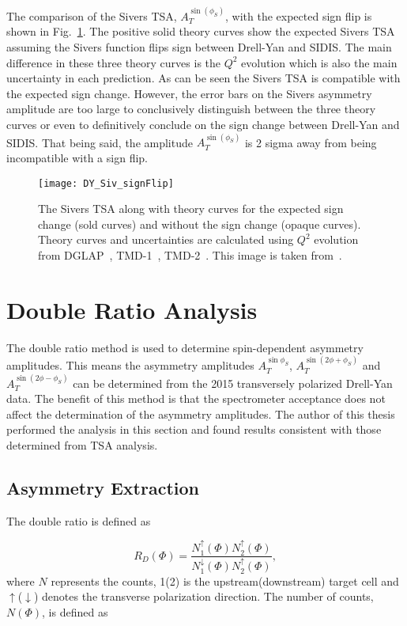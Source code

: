 The comparison of the Sivers TSA, $A_T^{\sin(\phi_S)}$, with the expected sign
flip is shown in Fig.~\ref{fig::DY_Siv_signFlip}.  The positive solid theory
curves show the expected Sivers TSA assuming the Sivers function flips sign
between Drell-Yan and SIDIS.  The main difference in these three theory curves
is the $Q^2$ evolution which is also the main uncertainty in each prediction.
As can be seen the Sivers TSA is compatible with the expected sign change.
However, the error bars on the Sivers asymmetry amplitude are too large to
conclusively distinguish between the three theory curves or even to definitively
conclude on the sign change between Drell-Yan and SIDIS.  That being said, the
amplitude $A_T^{\sin(\phi_S)}$ is 2 sigma away from being incompatible with a
sign flip.

\begin{figure}[h!t]
  \centering \texttt{[image: DY\_Siv\_signFlip]}
  \caption{The Sivers TSA along with theory curves for the expected sign change
    (sold curves) and without the sign change (opaque curves).  Theory curves
    and uncertainties are calculated using $Q^2$ evolution from
    DGLAP~\cite{Anselmino:2016uie}, TMD-1~\cite{Echevarria:2014xaa},
    TMD-2~\cite{Sun:2013hua}.  This image is taken from~\cite{compassDYpaper}.}
  \label{fig::DY_Siv_signFlip}
\end{figure}


\section{Double Ratio Analysis} \label{sec::doubleratio}
The double ratio method is used to determine spin-dependent asymmetry
amplitudes.  This means the asymmetry amplitudes $A^{\sin\phi_S}_T$,
$A^{\sin(2\phi+\phi_S)}_T$ and $A^{\sin(2\phi-\phi_S)}_T$ can be determined from
the 2015 transversely polarized Drell-Yan data.  The benefit of this method is
that the spectrometer acceptance does not affect the determination of the
asymmetry amplitudes.  The author of this thesis performed the analysis in this
section and found results consistent with those determined from TSA analysis.

\subsection{Asymmetry Extraction}
The double ratio is defined as

\begin{equation}
  R_D(\Phi) =
  \frac{N_1^{\uparrow}(\Phi)N_2^{\uparrow}(\Phi)}
       {N_1^{\downarrow}(\Phi)N_2^{\uparrow}(\Phi)},
\end{equation}
\noindent
where $N$ represents the counts, 1(2) is the upstream(downstream) target cell
and $\uparrow$($\downarrow$) denotes the transverse polarization direction.  The
number of counts, $N(\Phi)$, is defined as

